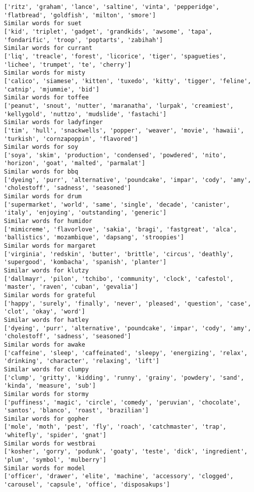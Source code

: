 \documentclass[11pt]{article}
\begin{document}
\begin{Verbatim}[commandchars=\\\{\}]
['ritz', 'graham', 'lance', 'saltine', 'vinta', 'pepperidge', 'flatbread', 'goldfish', 'milton', 'smore']
Similar words for suet
['kid', 'triplet', 'gadget', 'grandkids', 'awsome', 'tapa', 'fondarific', 'troop', 'poptarts', 'zabihah']
Similar words for currant
['liq', 'treacle', 'forest', 'licorice', 'tiger', 'spagueties', 'lichee', 'trumpet', 'te', 'cherry']
Similar words for misty
['calico', 'siamese', 'kitten', 'tuxedo', 'kitty', 'tigger', 'feline', 'catnip', 'mjummie', 'bid']
Similar words for toffee
['peanut', 'snout', 'nutter', 'maranatha', 'lurpak', 'creamiest', 'kellygold', 'nuttzo', 'mudslide', 'fastachi']
Similar words for ladyfinger
['tim', 'hull', 'snackwells', 'popper', 'weaver', 'movie', 'hawaii', 'turkish', 'cornzapoppin', 'flavored']
Similar words for soy
['soya', 'skim', 'production', 'condensed', 'powdered', 'nito', 'horizon', 'goat', 'malted', 'parmalat']
Similar words for bbq
['dyeing', 'purr', 'alternative', 'poundcake', 'impar', 'cody', 'amy', 'cholestoff', 'sadness', 'seasoned']
Similar words for drum
['supermarket', 'world', 'same', 'single', 'decade', 'canister', 'italy', 'enjoying', 'outstanding', 'generic']
Similar words for humidor
['mimicreme', 'flavorlove', 'sakia', 'bragi', 'fastgreat', 'alca', 'ballistics', 'mozambique', 'dapsang', 'stroopies']
Similar words for margaret
['virginia', 'redskin', 'butter', 'brittle', 'circus', 'deathly', 'supergood', 'kombacha', 'spanish', 'planter']
Similar words for klutzy
['dallmayr', 'pilon', 'tchibo', 'community', 'clock', 'cafestol', 'master', 'raven', 'cuban', 'gevalia']
Similar words for grateful
['happy', 'surely', 'finally', 'never', 'pleased', 'question', 'case', 'clot', 'okay', 'word']
Similar words for hatley
['dyeing', 'purr', 'alternative', 'poundcake', 'impar', 'cody', 'amy', 'cholestoff', 'sadness', 'seasoned']
Similar words for awake
['caffeine', 'sleep', 'caffeinated', 'sleepy', 'energizing', 'relax', 'drinking', 'character', 'relaxing', 'lift']
Similar words for clumpy
['clump', 'gritty', 'kidding', 'runny', 'grainy', 'powdery', 'sand', 'kinda', 'measure', 'sub']
Similar words for stormy
['puffiness', 'magic', 'circle', 'comedy', 'peruvian', 'chocolate', 'santos', 'blanco', 'roast', 'brazilian']
Similar words for gopher
['mole', 'moth', 'pest', 'fly', 'roach', 'catchmaster', 'trap', 'whitefly', 'spider', 'gnat']
Similar words for westbrai
['kosher', 'gorry', 'podunk', 'goaty', 'teste', 'dick', 'ingredient', 'plum', 'symbol', 'mulberry']
Similar words for model
['officer', 'drawer', 'elite', 'machine', 'accessory', 'clogged', 'carousel', 'capsule', 'office', 'disposakups']

\end{Verbatim}
\end{document}
